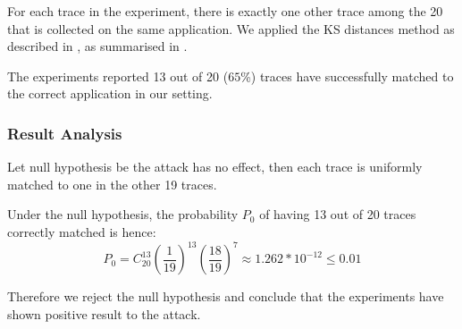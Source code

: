 For each trace in the experiment, there is exactly one other trace among the 20 that is collected on the same application. We applied the KS distances method as described in , as summarised in .

The experiments reported 13 out of 20 ($65$\%) traces have successfully matched to the correct application in our setting.

\subsubsection{Result Analysis}

Let null hypothesis be the attack has no effect, then each trace is uniformly matched to one in the other 19 traces. 

Under the null hypothesis, the probability $P_0$ of having 13 out of 20 traces correctly matched is hence:
\begin{equation*}
P_0 = C^{13}_{20} (\frac{1}{19})^{13} (\frac{18}{19})^{7} \approx 1.262 * 10^{-12} \leq 0.01
\end{equation*}

Therefore we reject the null hypothesis and conclude that the experiments have shown positive result to the attack.